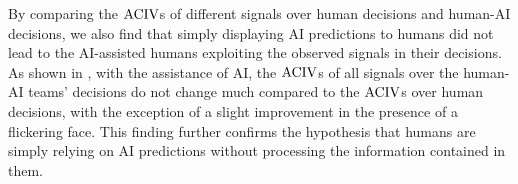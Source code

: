 By comparing the $\operatorname{ACIV}$s of different signals over human decisions and human-AI decisions, we also find that simply displaying AI predictions to humans did not lead to the AI-assisted humans exploiting the observed signals in their decisions.
As shown in , with the assistance of AI, the $\operatorname{ACIV}$s of all signals over the human-AI teams' decisions do not change much compared to the $\operatorname{ACIV}$s over human decisions, with the exception of a slight improvement in the presence of a flickering face.
This finding further confirms the hypothesis that humans are simply relying on AI predictions without processing the information contained in them.




